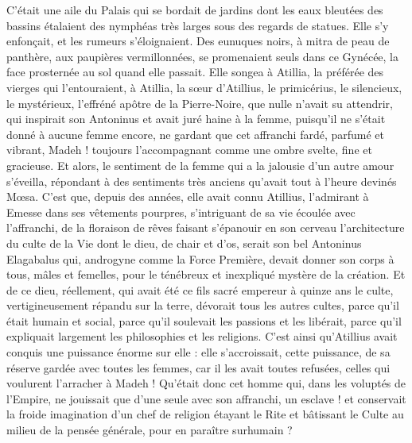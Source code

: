 \documentclass[a4paper, 11pt, oneside, polutonikogreek, french]{article}
\begin{document}
C'était une aile du Palais qui se bordait de jardins dont les eaux bleutées des bassins étalaient des nymphéas très larges sous des regards de statues. Elle s'y enfonçait, et les rumeurs s'éloignaient. Des eunuques noirs, à mitra de peau de panthère, aux paupières vermillonnées, se promenaient seuls dans ce Gynécée, la face prosternée au sol quand elle passait. Elle songea à Atillia, la préférée des vierges qui l'entouraient, à Atillia, la sœur d'Atillius, le primicérius, le silencieux, le mystérieux, l'effréné apôtre de la Pierre-Noire, que nulle n'avait su attendrir, qui inspirait son Antoninus et avait juré haine à la femme, puisqu'il ne s'était donné à aucune femme encore, ne gardant que cet affranchi fardé, parfumé et vibrant, Madeh ! toujours l'accompagnant comme une ombre svelte, fine et gracieuse. Et alors, le sentiment de la femme qui a la jalousie d'un autre amour s'éveilla, répondant à des sentiments très anciens qu'avait tout à l'heure devinés Mœsa. C'est que, depuis des années, elle avait connu Atillius, l'admirant à Emesse dans ses vêtements pourpres, s'intriguant de sa vie écoulée avec l'affranchi, de la floraison de rêves faisant s'épanouir en son cerveau l'architecture du culte de la Vie dont le dieu, de chair et d'os, serait son bel Antoninus Elagabalus qui, androgyne comme la Force Première, devait donner son corps à tous, mâles et femelles, pour le ténébreux et inexpliqué mystère de la création. Et de ce dieu, réellement, qui avait été ce fils sacré empereur à quinze ans le culte, vertigineusement répandu sur la terre, dévorait tous les autres cultes, parce qu'il était humain et social, parce qu'il soulevait les passions et les libérait, parce qu'il expliquait largement les philosophies et les religions. C'est ainsi qu'Atillius avait conquis une puissance énorme sur elle : elle s'accroissait, cette puissance, de sa réserve gardée avec toutes les femmes, car il les avait toutes refusées, celles qui voulurent l'arracher à Madeh ! Qu'était donc cet homme qui, dans les voluptés de l'Empire, ne jouissait que d'une seule avec son affranchi, un esclave ! et conservait la froide imagination d'un chef de religion étayant le Rite et bâtissant le Culte au milieu de la pensée générale, pour en paraître surhumain ?
\end{document}
